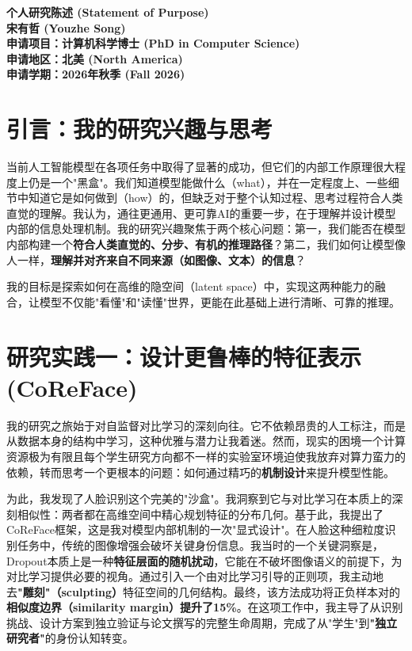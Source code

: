 \documentclass[11pt, letterpaper]{article}
\begin{document}
\begin{center}
    \fontsize{16pt}{18pt}\selectfont\bfseries
    个人研究陈述 (Statement of Purpose) \\[8pt]
    \large 宋有哲 (Youzhe Song) \\[4pt]
    \normalsize 申请项目：计算机科学博士 (PhD in Computer Science) \\
    \normalsize 申请地区：北美 (North America) \\
    \normalsize 申请学期：2026年秋季 (Fall 2026)
\end{center}
\vspace{1em} %


\section{引言：我的研究兴趣与思考}

当前人工智能模型在各项任务中取得了显著的成功，但它们的内部工作原理很大程度上仍是一个"黑盒"。我们知道模型能做什么（what），并在一定程度上、一些细节中知道它是如何做到（how）的，但缺乏对于整个认知过程、思考过程符合人类直觉的理解。我认为，通往更通用、更可靠AI的重要一步，在于理解并设计模型内部的信息处理机制。我的研究兴趣聚焦于两个核心问题：第一，我们能否在模型内部构建一个\textbf{符合人类直觉的、分步、有机的推理路径}？第二，我们如何让模型像人一样，\textbf{理解并对齐来自不同来源（如图像、文本）的信息}？

我的目标是探索如何在高维的隐空间（latent space）中，实现这两种能力的融合，让模型不仅能"看懂"和"读懂"世界，更能在此基础上进行清晰、可靠的推理。

\section{研究实践一：设计更鲁棒的特征表示 (CoReFace)}

我的研究之旅始于对自监督对比学习的深刻向往。它不依赖昂贵的人工标注，而是从数据本身的结构中学习，这种优雅与潜力让我着迷。然而，现实的困境一个计算资源极为有限且每个学生研究方向都不一样的实验室环境迫使我放弃对算力蛮力的依赖，转而思考一个更根本的问题：如何通过精巧的\textbf{机制设计}来提升模型性能。

为此，我发现了人脸识别这个完美的"沙盒"。我洞察到它与对比学习在本质上的深刻相似性：两者都在高维空间中精心规划特征的分布几何。基于此，我提出了CoReFace框架，这是我对模型内部机制的一次"显式设计"。在人脸这种细粒度识别任务中，传统的图像增强会破坏关键身份信息。我当时的一个关键洞察是，Dropout本质上是一种\textbf{特征层面的随机扰动}，它能在不破坏图像语义的前提下，为对比学习提供必要的视角。通过引入一个由对比学习引导的正则项，我主动地去\textbf{"雕刻"（sculpting）}特征空间的几何结构。最终，该方法成功将正负样本对的\textbf{相似度边界（similarity margin）提升了15\%}。在这项工作中，我主导了从识别挑战、设计方案到独立验证与论文撰写的完整生命周期，完成了从"学生"到\textbf{"独立研究者"}的身份认知转变\cite{coreface}。
\end{document}
